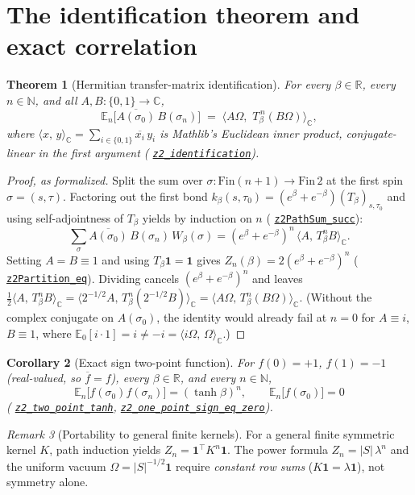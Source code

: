 \documentclass[11pt]{article}
\newtheorem{theorem}{Theorem}[section]
\newtheorem{corollary}[theorem]{Corollary}
\theoremstyle{remark}
\newtheorem{remark}[theorem]{Remark}
\theoremstyle{definition}
\newcommand{\anchor}{bd2c18394ce8a55ec73413c11a9f311bbf002248}
\newcommand{\osline}[3]{%
  \href{https://github.com/lluiseriksson/THE-ERIKSSON-PROGRAMME/blob/\anchor/YangMills/OS/#1.lean\#L#2}{\nolinkurl{#3}}}
\newcommand{\R}{\mathbb{R}}
\newcommand{\C}{\mathbb{C}}
\newcommand{\Om}{\Omega}
\newcommand{\inn}[2]{\langle #1,\, #2\rangle_{\C}}
\newcommand{\Ex}{\mathbb{E}}
\begin{document}
\section{The identification theorem and exact correlation}\label{sec:ident}

\begin{theorem}[Hermitian transfer-matrix identification]\label{thm:ident}
For every $\beta \in \R$, every $n \in \mathbb{N}$, and all $A, B : \{0,1\} \to \C$,
\[
  \Ex_n\bigl[\overline{A(\sigma_0)}\,B(\sigma_n)\bigr]
  \;=\; \inn{A\Om}{\,T_\beta^{\,n}(B\Om)},
\]
where $\inn{x}{y} = \sum_{i\in\{0,1\}} \overline{x_i}\,y_i$ is Mathlib's Euclidean inner
product, conjugate-linear in the first argument (\osline{Z2Identification}{269}{z2\_identification}).
\end{theorem}

\begin{proof}[Proof, as formalized]
Split the sum over $\sigma : \mathrm{Fin}(n+1) \to \mathrm{Fin}\,2$ at the first spin
$\sigma = (s,\tau)$. Factoring out the first bond $k_\beta(s,\tau_0) = (e^\beta+e^{-\beta})
(T_\beta)_{s,\tau_0}$ and using self-adjointness of $T_\beta$ yields by induction on $n$
(\osline{Z2Identification}{171}{z2PathSum\_succ}):
\[
  \sum_{\sigma} \overline{A(\sigma_0)}\,B(\sigma_n)\,W_\beta(\sigma)
  = (e^\beta + e^{-\beta})^n\,\inn{A}{T_\beta^n B}.
\]
Setting $A = B \equiv 1$ and using $T_\beta\mathbf{1} = \mathbf{1}$ gives
$Z_n(\beta) = 2(e^\beta + e^{-\beta})^n$ (\osline{Z2Identification}{221}{z2Partition\_eq}).
Dividing cancels $(e^\beta+e^{-\beta})^n$ and leaves
$\tfrac{1}{2}\inn{A}{T_\beta^n B} = \inn{2^{-1/2}A}{T_\beta^n(2^{-1/2}B)} = \inn{A\Om}{T_\beta^n(B\Om)}$.
(Without the complex conjugate on $A(\sigma_0)$, the identity would already fail at $n=0$
for $A \equiv i$, $B \equiv 1$, where $\Ex_0[i\cdot 1] = i \neq -i = \inn{i\Om}{\Om}$.)
\end{proof}

\begin{corollary}[Exact sign two-point function]\label{thm:endpoint}
For $f(0) = +1$, $f(1) = -1$ (real-valued, so $\overline{f} = f$), every $\beta \in \R$,
and every $n \in \mathbb{N}$,
\[
  \Ex_n\bigl[f(\sigma_0)f(\sigma_n)\bigr] = (\tanh\beta)^n,
  \qquad
  \Ex_n\bigl[f(\sigma_0)\bigr] = 0
\]
(\osline{Z2Identification}{346}{z2\_two\_point\_tanh},
\osline{Z2Identification}{352}{z2\_one\_point\_sign\_eq\_zero}).
\end{corollary}

\begin{remark}[Portability to general finite kernels]
For a general finite symmetric kernel $K$, path induction yields $Z_n = \mathbf{1}^\top K^n \mathbf{1}$.
The power formula $Z_n = |S|\,\lambda^n$ and the uniform vacuum $\Om = |S|^{-1/2}\mathbf{1}$
require \emph{constant row sums} ($K\mathbf{1} = \lambda\mathbf{1}$), not symmetry alone.
\end{remark}
\end{document}
